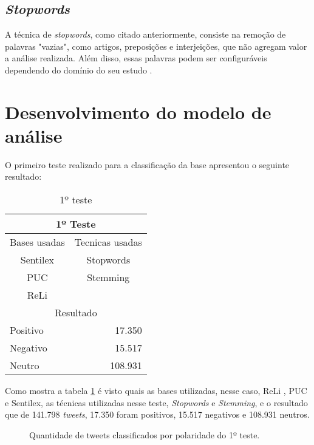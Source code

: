\subsection{\textit{Stopwords}}
A técnica de \textit{stopwords}, como citado anteriormente, consiste na remoção de palavras "vazias", como artigos, preposições e interjeições, que não agregam valor a análise realizada. Além disso, essas palavras podem ser configuráveis dependendo do domínio do seu estudo  \cite{Rajaraman_Ullman_2011}.

\section{Desenvolvimento do modelo de análise}\label{sec:desenv-moda}
O primeiro teste realizado para a classificação da base apresentou o seguinte resultado:

\begin{table}[H]
	\centering
	\caption{1º teste}
	\label{teste-1}
	\begin{tabular}{|l|l|r}
		\hline
		\multicolumn{3}{|c|}{1º Teste} \\ \hline
		\multicolumn{2}{|l|}{Bases usadas} & \multicolumn{1}{r|}{Tecnicas usadas} \\ \hline
		\multicolumn{2}{|c|}{Sentilex} & \multicolumn{1}{c|}{Stopwords} \\
		\multicolumn{2}{|c|}{PUC} & \multicolumn{1}{c|}{Stemming} \\ \cline{3-3} 
		\multicolumn{2}{|c|}{ReLi} &  \\ \hline
		\multicolumn{3}{|c|}{Resultado} \\ \hline
		\multicolumn{2}{|l|}{Positivo} & \multicolumn{1}{r|}{17.350} \\ \hline
		\multicolumn{2}{|l|}{Negativo} & \multicolumn{1}{r|}{15.517} \\ \hline
		\multicolumn{2}{|l|}{Neutro} & \multicolumn{1}{r|}{108.931} \\ \hline
	\end{tabular}
\end{table}

Como mostra a tabela \ref{teste-1} é visto quais as bases utilizadas, nesse caso, ReLi , PUC e Sentilex, as técnicas utilizadas nesse teste, \textit{Stopwords} e \textit{Stemming}, e o resultado que de 141.798 \textit{tweets}, 17.350 foram positivos, 15.517 negativos e 108.931 neutros.
\begin{figure}[H]
	\centering{}
	\caption{Quantidade de tweets classificados por polaridade do 1º teste.}
	\label{teste-graf-1}
\end{figure}

